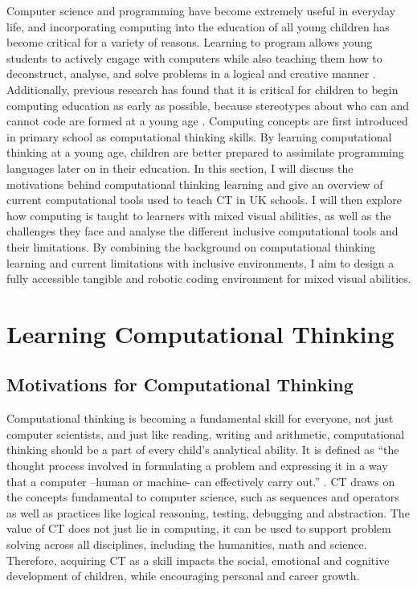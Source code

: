 \documentclass[oneside,%
                    author={Malak Hajji},
                    degree={BSc},
                    title={Designing An Accessible Computational Toolkit For Students},
                  subtitle={With Mixed Visual Abilities}]{dissertation}
\begin{document}
Computer science and programming have become extremely useful in everyday life, and incorporating computing into the education of all young children has become critical for a variety of reasons. Learning to program allows young students to actively engage with computers while also teaching them how to deconstruct, analyse, and solve problems in a logical and creative manner \cite{CB-intro1}.
Additionally, previous research has found that it is critical for children to begin computing education as early as possible, because stereotypes about who can and cannot code are formed at a young age \cite{CB-intro2, CB-intro3}.
Computing concepts are first introduced in primary school as computational thinking skills. By learning computational thinking at a young age, children are better prepared to assimilate programming languages later on in their education. 
In this section, I will discuss the motivations behind computational thinking learning and give an overview of current computational tools used to teach CT in UK schools. I will then explore how computing is taught to learners with mixed visual abilities, as well as the challenges they face and analyse the different inclusive computational tools and their limitations. By combining the background on computational thinking learning and current limitations with  inclusive environments, I aim to design a fully accessible tangible  and robotic coding environment for mixed visual abilities.

\section{Learning Computational Thinking}  
\subsection{Motivations for Computational Thinking}
Computational thinking is becoming a fundamental skill for everyone, not just computer scientists, and just like reading, writing and arithmetic, computational thinking should be a part of every child’s analytical ability. It is defined as “the thought process involved in formulating a problem and expressing it in a way that a computer –human or machine- can effectively carry out.” \cite{CB-CT1}. CT draws on the concepts fundamental to computer science, such as sequences and operators as well as practices like logical reasoning, testing, debugging and abstraction. The value of CT does not just lie in computing, it can be used to support problem solving across all disciplines, including the humanities, math and science. Therefore, acquiring CT as a skill impacts the social, emotional and cognitive development of children, while encouraging personal and career growth.
\end{document}
